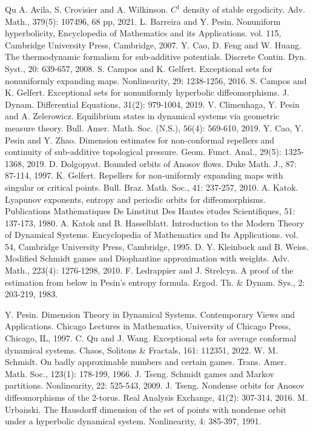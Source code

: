 \documentclass[11pt,a4paper]{amsart}
\theoremstyle{plain}
\theoremstyle{remark}
\begin{document}
	
	\begin{thebibliography}{Qu}
		A. Avila, S. Crovisier and A. Wilkinson. $C^1$  density of stable ergodicity. Adv. Math., 379(5): 107496, 68 pp, 2021.
		 L. Barreira and Y. Pesin. Nonuniform hyperbolicity, Encyclopedia of Mathematics
		and its Applications. vol. 115, Cambridge University Press, Cambridge, 2007.
		Y. Cao, D. Feng and W. Huang. The thermodynamic formalism for sub-additive potentials. Discrete Contin. Dyn. Syst., 20: 639-657, 2008.
		S. Campos and K. Gelfert. Exceptional sets for nonuniformly expanding maps. Nonlinearity, 29:  1238-1256, 2016.
		S. Campos and K. Gelfert. Exceptional sets for nonuniformly hyperbolic diffeomorphisms. J. Dynam. Differential Equations, 31(2): 979-1004, 2019.
		 V. Climenhaga, Y. Pesin and A. Zelerowicz. Equilibrium states in dynamical systems via geometric measure theory. Bull.
		Amer. Math. Soc. (N.S.), 56(4): 569-610, 2019.
		  Y. Cao, Y. Pesin and Y. Zhao. Dimension estimates for non-conformal repellers and continuity of sub-additive topological pressure. Geom. Funct. Anal., 29(5): 1325-1368, 2019. 
		D. Dolgopyat. Bounded orbits of Anosov flows. Duke Math. J., 87:  87-114, 1997.
		K. Gelfert. Repellers for non-uniformly expanding maps with singular or critical points. Bull.
		Braz. Math. Soc., 41: 237-257, 2010.
		 A. Katok. Lyapunov exponents, entropy and periodic orbits for diffeomorphisms. Publications Math$\acute{\text{e}}$matiques De Linstitut Des Hautes $\acute{\text{e}}$tudes Scientifiques, 51: 137-173, 1980.
		A. Katok and B. Hasselblatt. Introduction to the Modern Theory of Dynamical Systems. Encyclopedia of Mathematics and Its Applications. vol. 54, Cambridge University Press, Cambridge, 1995.
		D. Y. Kleinbock and B. Weiss. Modified Schmidt games and Diophantine approximation with weights. Adv. Math., 223(4): 1276-1298, 2010.
		F. Ledrappier and J. Strelcyn. A proof of the estimation from below in Pesin's entropy formula. Ergod. Th. \& Dynam. Sys., 2: 203-219, 1983.
		
		Y. Pesin. Dimension Theory in Dynamical Systems. Contemporary Views and Applications. Chicago Lectures in Mathematics, University of Chicago Press, Chicago, IL, 1997.
		C. Qu and J. Wang. Exceptional sets for average conformal dynamical systems. Chaos, Solitons \& Fractals, 161: 112351, 2022.
		W. M. Schmidt. On badly approximable numbers and certain games. Trans. Amer. Math. Soc., 123(1): 178-199, 1966.
		J. Tseng. Schmidt games and Markov partitions. Nonlinearity, 22:  525-543, 2009.
		J. Tseng. Nondense orbits for Anosov diffeomorphisms of the 2-torus. Real Analysis Exchange, 41(2):  307-314, 2016.
		M. Urba$\acute{\text{n}}$ski. The Hausdorff dimension of the set of points with nondense orbit under a hyperbolic dynamical system. Nonlinearity, 4: 385-397, 1991.
		

\end{thebibliography}
\end{document}
